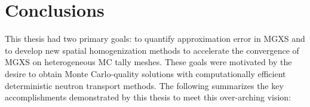 \chapter{Conclusions}
\label{chap:conclusions}

This thesis had two primary goals: to quantify approximation error in MGXS and to develop new spatial homogenization methods to accelerate the convergence of MGXS on heterogeneous MC tally meshes. These goals were motivated by the desire to obtain Monte Carlo-quality solutions with computationally efficient deterministic neutron transport methods. The following summarizes the key accomplishments demonstrated by this thesis to meet this over-arching vision:



